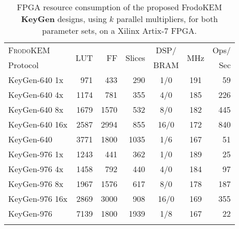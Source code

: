 \begin{table}[!t]
\centering
\caption{FPGA resource consumption of the proposed FrodoKEM \textbf{KeyGen} designs, using $k$ parallel multipliers, for both parameter sets, on a Xilinx Artix-7 FPGA.}\label{tab:keyresults}
\begin{tabular}{l r r r c c r}
\hline \Tstrut
  \textsc{FrodoKEM} & \multirow{2}{*}{LUT} & \multirow{2}{*}{FF} & \multirow{2}{*}{Slices} & DSP/ & \multirow{2}{*}{MHz} & Ops/ \\
Protocol &&&& BRAM && Sec  \\ \hline \Tstrut

KeyGen-640 1x & 971 & 433 & 290 & 1/0 & 191 & 59 \\
KeyGen-640 4x & 1174 & 781 & 355 & 4/0 & 185 & 226 \\
KeyGen-640 8x & 1679 & 1570 & 532 & 8/0 & 182 & 445 \\
KeyGen-640 16x & 2587 & 2994 & 855 & 16/0 & 172 & 840 \\ \hline \Tstrut
KeyGen-640 \cite{howe2018standard} & 3771 & 1800 & 1035 & 1/6 & 167 & 51 \\ \hline \Tstrut

KeyGen-976 1x & 1243 & 441 & 362 & 1/0 & 189 & 25 \\
KeyGen-976 4x & 1458 & 792 & 440 & 4/0 & 184 & 97 \\
KeyGen-976 8x & 1967 & 1576 & 617 & 8/0 & 178 & 187 \\
KeyGen-976 16x & 2869 & 3000 & 908 & 16/0 & 169 & 355 \\ \hline \Tstrut
KeyGen-976 \cite{howe2018standard} & 7139 & 1800 & 1939 & 1/8 & 167 & 22 \\ \hline \Tstrut

\end{tabular}%
\end{table}

